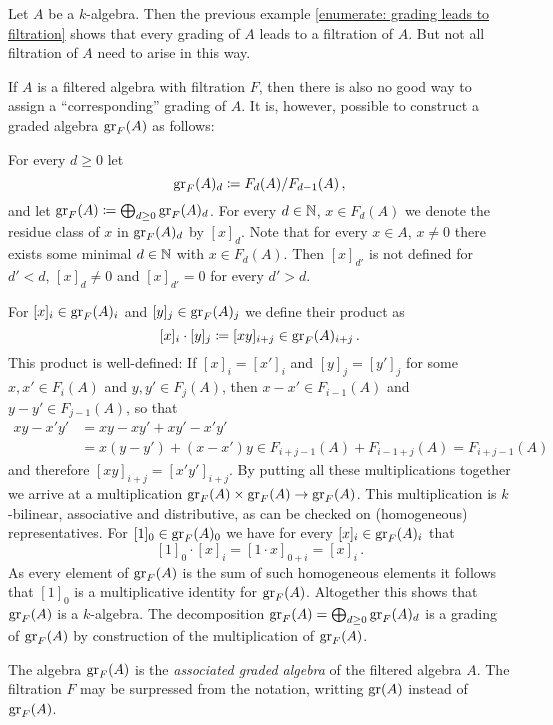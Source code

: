 \begin{fluff}
  Let $A$ be a $k$-algebra.
  Then the previous example \ref{enumerate: grading leads to filtration} shows that every grading of $A$ leads to a filtration of $A$.
  But not all filtration of $A$ need to arise in this way. %
  
  If $A$ is a filtered algebra with filtration $F$, then there is also no good way to assign a “corresponding” grading of $A$. %
  It is, however, possible to construct a graded algebra $\operatorname{gr}_F(A)$ as follows:
  
  For every $d \geq 0$ let
  \[
              \operatorname{gr}_F(A)_d
    \coloneqq  F_d(A) / F_{d-1}(A) \,,
  \]
  and let $\operatorname{gr}_F(A) \coloneqq \bigoplus_{d \geq 0} \operatorname{gr}_F(A)_d$.
  For every $d \in \mathbb{N}$, $x \in F_d(A)$ we denote the residue class of $x$ in $\operatorname{gr}_F(A)_d$ by $[x]_d$.
  Note that for every $x \in A$, $x \neq 0$ there exists some minimal $d \in \mathbb{N}$ with $x \in F_d(A)$.
  Then $[x]_{d'}$ is not defined for $d' < d$, $[x]_d \neq 0$ and $[x]_{d'} = 0$ for every $d' > d$.
  
  For $[x]_i \in \operatorname{gr}_F(A)_i$ and $[y]_j \in \operatorname{gr}_F(A)_j$ we define their product as
  \[
              [x]_i \cdot [y]_j
    \coloneqq  [xy]_{i+j}
    \in       \operatorname{gr}_F(A)_{i+j} \,.
  \]
  This product is well-defined:
  If $[x]_i = [x']_i$ and $[y]_j = [y']_j$ for some $x, x' \in F_i(A)$ and $y, y' \in F_j(A)$, then $x - x' \in F_{i-1}(A)$ and $y - y' \in F_{j-1}(A)$, so that
  \begin{align*}
          xy - x'y'
    &=    xy - xy' + xy' - x'y' \\
    &=    x(y-y') + (x-x')y
     \in  F_{i+j-1}(A) + F_{i-1+j}(A)
     =    F_{i+j-1}(A)
  \end{align*}
  and therefore $[xy]_{i+j} = [x'y']_{i+j}$.
  By putting all these multiplications together we arrive at a multiplication $\operatorname{gr}_F(A) \times \operatorname{gr}_F(A) \to \operatorname{gr}_F(A)$.
  This multiplication is $k$-bilinear, associative and distributive, as can be checked on (homogeneous) representatives.
  For $[1]_0 \in \operatorname{gr}_F(A)_0$ we have for every $[x]_i \in \operatorname{gr}_F(A)_i$ that
  \[
        [1]_0 \cdot [x]_i
    =   [1 \cdot x]_{0+i}
    =   [x]_i \,.
  \]
  As every element of $\operatorname{gr}_F(A)$ is the sum of such homogeneous elements it follows that $[1]_0$ is a multiplicative identity for $\operatorname{gr}_F(A)$.
  Altogether this shows that $\operatorname{gr}_F(A)$ is a $k$-algebra.
  The decomposition $\operatorname{gr}_F(A) = \bigoplus_{d \geq 0} \operatorname{gr}_F(A)_d$ is a grading of $\operatorname{gr}_F(A)$ by construction of the multiplication of $\operatorname{gr}_F(A)$.
  
  The algebra $\operatorname{gr}_F(A)$ is the \emph{associated graded algebra} of the filtered algebra $A$.
  The filtration $F$ may be surpressed from the notation, writting $\operatorname{gr}(A)$ instead of $\operatorname{gr}_F(A)$.
\end{fluff}


